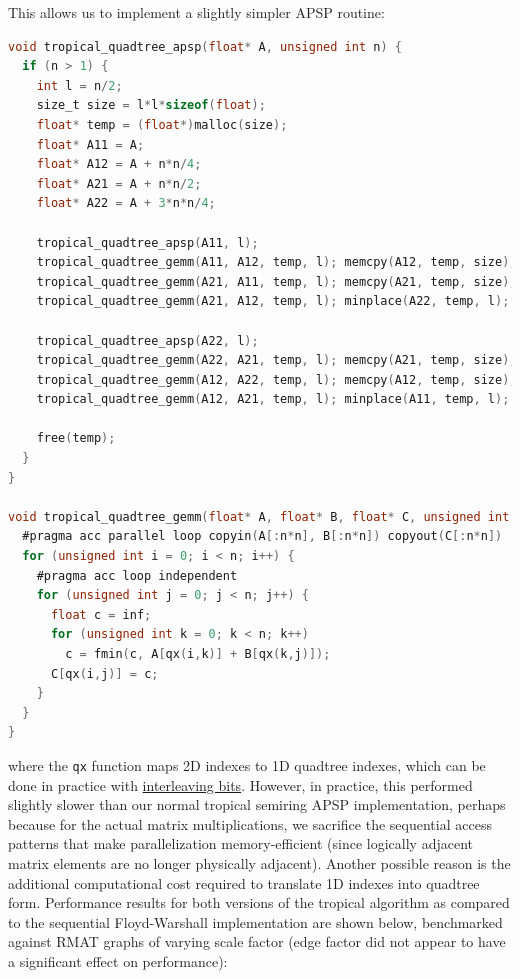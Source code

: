 \documentclass[12pt]{article}
\newcommand*{\ttfamilywithbold}{\fontfamily{lmtt}\selectfont}
\begin{document}
This allows us to implement a slightly simpler APSP routine:

\begin{lstlisting}[language=C,basicstyle=\ttfamilywithbold\footnotesize]
void tropical_quadtree_apsp(float* A, unsigned int n) {
  if (n > 1) {
    int l = n/2;
    size_t size = l*l*sizeof(float);
    float* temp = (float*)malloc(size);
    float* A11 = A;
    float* A12 = A + n*n/4;
    float* A21 = A + n*n/2;
    float* A22 = A + 3*n*n/4;

    tropical_quadtree_apsp(A11, l);
    tropical_quadtree_gemm(A11, A12, temp, l); memcpy(A12, temp, size);
    tropical_quadtree_gemm(A21, A11, temp, l); memcpy(A21, temp, size);
    tropical_quadtree_gemm(A21, A12, temp, l); minplace(A22, temp, l);

    tropical_quadtree_apsp(A22, l);
    tropical_quadtree_gemm(A22, A21, temp, l); memcpy(A21, temp, size);
    tropical_quadtree_gemm(A12, A22, temp, l); memcpy(A12, temp, size);
    tropical_quadtree_gemm(A12, A21, temp, l); minplace(A11, temp, l);

    free(temp);
  }
}

void tropical_quadtree_gemm(float* A, float* B, float* C, unsigned int n) {
  #pragma acc parallel loop copyin(A[:n*n], B[:n*n]) copyout(C[:n*n])
  for (unsigned int i = 0; i < n; i++) {
    #pragma acc loop independent
    for (unsigned int j = 0; j < n; j++) {
      float c = inf;
      for (unsigned int k = 0; k < n; k++)
        c = fmin(c, A[qx(i,k)] + B[qx(k,j)]);
      C[qx(i,j)] = c;
    }
  }
}
\end{lstlisting}

where the \texttt{qx} function maps 2D indexes to 1D quadtree indexes, which can be done in practice with \href{http://graphics.stanford.edu/~seander/bithacks.html#InterleaveBMN}{interleaving bits}. However, in practice, this performed slightly slower than our normal tropical semiring APSP implementation, perhaps because for the actual matrix multiplications, we sacrifice the sequential access patterns that make parallelization memory-efficient (since logically adjacent matrix elements are no longer physically adjacent). Another possible reason is the additional computational cost required to translate 1D indexes into quadtree form. Performance results for both versions of the tropical algorithm as compared to the sequential Floyd-Warshall implementation are shown below, benchmarked against RMAT graphs of varying scale factor (edge factor did not appear to have a significant effect on performance):
\end{document}

